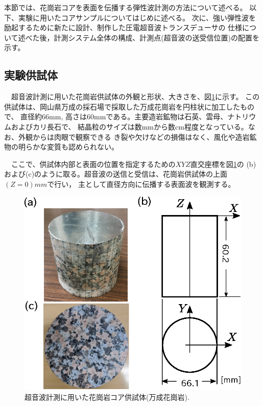 ﻿本節では、花崗岩コアを表面を伝播する弾性波計測の方法について述べる。
以下、実験に用いたコアサンプルについてはじめに述べる。
次に、強い弾性波を励起するために新たに設計、制作した圧電超音波トランスデューサの
仕様について述べた後，計測システム全体の構成、計測点(超音波の送受信位置)の配置を示す。
\subsection{実験供試体}
　超音波計測に用いた花崗岩供試体の外観と形状、大きさを、図\ref{fig:fig1}に示す。
この供試体は、岡山県万成の採石場で採取した万成花崗岩を円柱状に加工したもので、
直径約66mm, 高さは60mmである。主要造岩鉱物は石英、雲母、ナトリウムおよびカリ長石で、
結晶粒のサイズは数mmから数cm程度となっている。なお、外観からは肉眼で観察できる
き裂や欠けなどの損傷はなく、風化や造岩鉱物の明らかな変質も認められない。

　ここで、供試体内部と表面の位置を指定するための$XYZ$直交座標を図\ref{fig:fig1}の
(b)および(c)のように取る。超音波の送信と受信は、花崗岩供試体の上面$(Z=0)mm$で行い，
主として直径方向に伝播する表面波を観測する。
\begin{figure}[h]
	\begin{center}
	\includegraphics[width=0.6\linewidth]{Figs/fig1.eps} 
	\end{center}
	\caption{
		超音波計測に用いた花崗岩コア供試体(万成花崗岩).
	} 
	\label{fig:fig1}
\end{figure}
